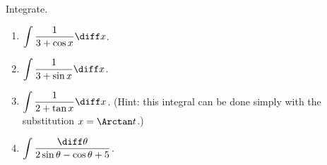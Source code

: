 Integrate.
\begin{enumerate}[ref={\fcProblemRef}]
\item \label{problemInt1/(3+cos x)dx} $\displaystyle \int \frac{1}{3+\cos x}\diff x$.

\item $\displaystyle \int \frac{1}{3+\sin x}\diff x$.

\item \label{problemInt1/(2+tan x)dx}$\displaystyle \int \frac{1}{2+\tan x}\diff x$.  (Hint: this integral can be done simply with the substitution $x=\Arctan t$.)


\item $\displaystyle \int \frac{ \diff \theta }{ 2\sin \theta - \cos \theta +5}$.


\end{enumerate}